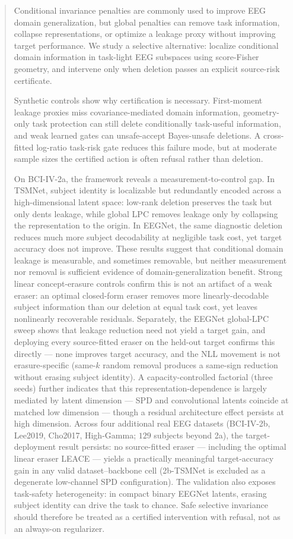 \begin{abstract}
Conditional invariance penalties are commonly used to improve EEG domain generalization, but global
penalties can remove task information, collapse representations, or optimize a leakage proxy without
improving target performance. We study a selective alternative: localize conditional domain information in
task-light EEG subspaces using score-Fisher geometry, and intervene only when deletion passes an explicit
source-risk certificate.

Synthetic controls show why certification is necessary. First-moment leakage proxies miss covariance-mediated
domain information, geometry-only task protection can still delete conditionally task-useful information, and
weak learned gates can unsafe-accept Bayes-unsafe deletions. A cross-fitted log-ratio task-risk gate reduces
this failure mode, but at moderate sample sizes the certified action is often refusal rather than deletion.

On BCI-IV-2a, the framework reveals a measurement-to-control gap. In TSMNet, subject identity is localizable
but redundantly encoded across a high-dimensional latent space: low-rank deletion preserves the task but only
dents leakage, while global LPC removes leakage only by collapsing the representation to the origin. In
EEGNet, the same diagnostic deletion reduces much more subject decodability at negligible task cost, yet target
accuracy does not improve. These results suggest that conditional domain leakage is measurable, and sometimes
removable, but neither measurement nor removal is sufficient evidence of domain-generalization benefit.
Strong linear concept-erasure controls confirm this is not an artifact of a weak eraser: an optimal
closed-form eraser removes more linearly-decodable subject information than our deletion at equal task cost,
yet leaves nonlinearly recoverable residuals. Separately, the EEGNet global-LPC sweep shows that leakage
reduction need not yield a target gain, and deploying every source-fitted eraser on the held-out target confirms
this directly --- none improves target accuracy, and the NLL movement is not erasure-specific (same-$k$ random
removal produces a same-sign reduction without erasing subject identity). A capacity-controlled factorial
(three seeds) further indicates that this representation-dependence is largely mediated by latent dimension ---
SPD and convolutional latents coincide at matched low dimension --- though a residual architecture effect
persists at high dimension. Across four additional real EEG datasets (BCI-IV-2b, Lee2019, Cho2017, High-Gamma;
$129$ subjects beyond 2a), the target-deployment result persists: no source-fitted eraser --- including the
optimal linear eraser LEACE --- yields a practically meaningful target-accuracy gain in any valid
dataset--backbone cell (2b-TSMNet is excluded as a degenerate low-channel SPD configuration). The validation
also exposes task-safety heterogeneity: in compact binary EEGNet latents, erasing subject identity can drive
the task to chance. Safe selective invariance should
therefore be treated as a certified intervention with refusal, not as an always-on regularizer.
\end{abstract}
